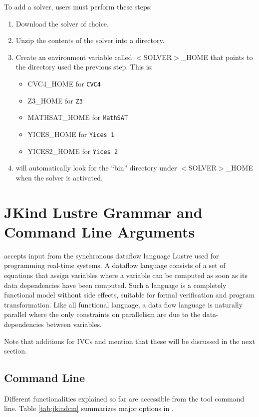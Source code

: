 To add a solver, users must perform these steps:
\begin{enumerate}
  \item Download the solver of choice.
  \item Unzip the contents of the solver into a directory.
  \item Create an environment variable called $<$SOLVER$>$\_HOME that points to the directory used the previous step. This is:
      \begin{itemize}
        \item CVC4\_HOME for \texttt{CVC4}
        \item Z3\_HOME for \texttt{Z3}
        \item MATHSAT\_HOME for \texttt{MathSAT}
        \item YICES\_HOME for \texttt{Yices 1}
        \item YICES2\_HOME for \texttt{Yices 2}
      \end{itemize}
  \item \jkind will automatically look for the ``bin'' directory under $<$SOLVER$>$\_HOME when the solver is activated.
\end{enumerate}


\section{{\sc JKind} Lustre Grammar and Command Line Arguments}
\jkind accepts input from the synchronous dataflow language Lustre used for programming real-time systems. A dataflow language consists of a set of equations that assign variables where a variable can be computed as soon as its data dependencies have been computed. Such a language is a completely functional model without side effects, suitable for formal verification and program transformation. Like all functional language, a data flow language is naturally parallel where the only constraints on parallelism are due to the data-dependencies between variables. 

Note that additions for IVCs and mention that these will be discussed in the next section.

\subsection{Command Line}
Different \jkind functionalities explained so far are accessible from the tool command line. Table \ref{tab:jkindcm} summarizes major options in \jkind.

